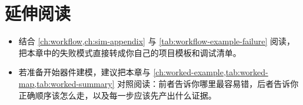 \section*{延伸阅读}
\begin{itemize}
  \item 结合 \cref{ch:workflow,ch:sim-appendix} 与 \cref{tab:workflow-example-failure} 阅读，把本章中的失败模式直接转成你自己的项目模板和调试清单。

  \item 若准备开始器件建模，建议把本章与 \cref{ch:worked-example,tab:worked-map,tab:worked-summary} 对照阅读：前者告诉你哪里最容易错，后者告诉你正确顺序该怎么走，以及每一步应该先产出什么证据。
\end{itemize}



